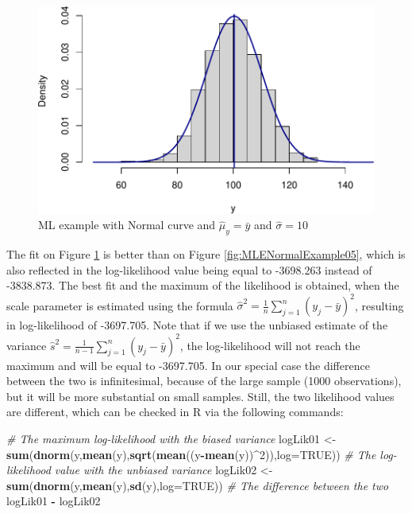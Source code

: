 \documentclass[
]{book}
\newenvironment{Shaded}{\begin{snugshade}}{\end{snugshade}}
\newcommand{\AttributeTok}[1]{\textcolor[rgb]{0.13,0.29,0.53}{#1}}
\newcommand{\CommentTok}[1]{\textcolor[rgb]{0.56,0.35,0.01}{\textit{#1}}}
\newcommand{\ConstantTok}[1]{\textcolor[rgb]{0.56,0.35,0.01}{#1}}
\newcommand{\DecValTok}[1]{\textcolor[rgb]{0.00,0.00,0.81}{#1}}
\newcommand{\FunctionTok}[1]{\textcolor[rgb]{0.13,0.29,0.53}{\textbf{#1}}}
\newcommand{\NormalTok}[1]{#1}
\newcommand{\OtherTok}[1]{\textcolor[rgb]{0.56,0.35,0.01}{#1}}
\newcommand{\SpecialCharTok}[1]{\textcolor[rgb]{0.81,0.36,0.00}{\textbf{#1}}}
\theoremstyle{definition}
\theoremstyle{definition}
\theoremstyle{definition}
\theoremstyle{definition}
\theoremstyle{remark}
\begin{document}
\begin{figure}
\centering
\includegraphics{Svetunkov---Statistics-for-Business-Analytics_files/figure-latex/MLENormalExample06-1.pdf}
\caption{\label{fig:MLENormalExample06}ML example with Normal curve and \(\hat{\mu}_y=\bar{y}\) and \(\hat{\sigma}=10\)}
\end{figure}

The fit on Figure \ref{fig:MLENormalExample06} is better than on Figure \ref{fig:MLENormalExample05}, which is also reflected in the log-likelihood value being equal to -3698.263 instead of -3838.873. The best fit and the maximum of the likelihood is obtained, when the scale parameter is estimated using the formula \(\hat{\sigma}^2 = \frac{1}{n}\sum_{j=1}^n\left(y_j - \bar{y}\right)^2\), resulting in log-likelihood of -3697.705. Note that if we use the unbiased estimate of the variance \(\hat{s}^2 = \frac{1}{n-1}\sum_{j=1}^n\left(y_j - \bar{y}\right)^2\), the log-likelihood will not reach the maximum and will be equal to -3697.705. In our special case the difference between the two is infinitesimal, because of the large sample (1000 observations), but it will be more substantial on small samples. Still, the two likelihood values are different, which can be checked in R via the following commands:

\begin{Shaded}
\begin{Highlighting}[]
\CommentTok{\# The maximum log{-}likelihood with the biased variance}
\NormalTok{logLik01 }\OtherTok{\textless{}{-}} \FunctionTok{sum}\NormalTok{(}\FunctionTok{dnorm}\NormalTok{(y,}\FunctionTok{mean}\NormalTok{(y),}\FunctionTok{sqrt}\NormalTok{(}\FunctionTok{mean}\NormalTok{((y}\SpecialCharTok{{-}}\FunctionTok{mean}\NormalTok{(y))}\SpecialCharTok{\^{}}\DecValTok{2}\NormalTok{)),}\AttributeTok{log=}\ConstantTok{TRUE}\NormalTok{))}
\CommentTok{\# The log{-}likelihood value with the unbiased variance}
\NormalTok{logLik02 }\OtherTok{\textless{}{-}} \FunctionTok{sum}\NormalTok{(}\FunctionTok{dnorm}\NormalTok{(y,}\FunctionTok{mean}\NormalTok{(y),}\FunctionTok{sd}\NormalTok{(y),}\AttributeTok{log=}\ConstantTok{TRUE}\NormalTok{))}
\CommentTok{\# The difference between the two}
\NormalTok{logLik01 }\SpecialCharTok{{-}}\NormalTok{ logLik02}
\end{Highlighting}
\end{Shaded}
\end{document}
